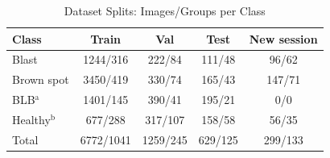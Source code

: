 \begin{table}[htbp]
\caption{Dataset Splits: Images/Groups per Class}
\begin{center}
\setlength{\tabcolsep}{3pt}
\begin{tabular}{|l|c|c|c|c|}
\hline
\textbf{Class} & \textbf{Train} & \textbf{Val} & \textbf{Test} & \textbf{New session} \\
\hline
Blast & 1244/316 & 222/84 & 111/48 & 96/62 \\
Brown spot & 3450/419 & 330/74 & 165/43 & 147/71 \\
BLB$^{\mathrm{a}}$ & 1401/145 & 390/41 & 195/21 & 0/0 \\
Healthy$^{\mathrm{b}}$ & 677/288 & 317/107 & 158/58 & 56/35 \\
\hline
Total & 6772/1041 & 1259/245 & 629/125 & 299/133 \\
\hline
\end{tabular}
\par{}
\label{tab:data}
\end{center}
\end{table}

